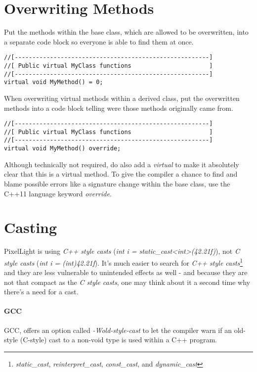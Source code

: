 \section{Overwriting Methods}
Put the methods within the base class, which are allowed to be overwritten, into a separate code block so everyone is able to find them at once.
\begin{lstlisting}[caption=Virtual methods within a base class]
//[-------------------------------------------------------]
//[ Public virtual MyClass functions                      ]
//[-------------------------------------------------------]
virtual void MyMethod() = 0;
\end{lstlisting}

When overwriting virtual methods within a derived class, put the overwritten methods into a code block telling were those methods originally came from.
\begin{lstlisting}[caption=Overwriting virtual methods within a derived class]
//[-------------------------------------------------------]
//[ Public virtual MyClass functions                      ]
//[-------------------------------------------------------]
virtual void MyMethod() override;
\end{lstlisting}
Although technically not required, do also add a \emph{virtual} to make it absolutely clear that this is a virtual method. To give the compiler a chance to find and blame possible errors like a signature change within the base class, use the C++11 language keyword \emph{override}.




\section{Casting}
PixelLight is using \emph{C++ style casts} (\emph{int i = static\_cast<int>(42.21f)}), not \emph{C style casts} (\emph{int i = (int)42.21f}). It's much easier to search for \emph{C++ style casts}\footnote{\emph{static\_cast}, \emph{reinterpret\_cast}, \emph{const\_cast}, and \emph{dynamic\_cast}} and they are less vulnerable to unintended effects as well - and because they are not that compact as the \emph{C style casts}, one may think about it a second time why there's a need for a cast.

\paragraph{\ac{GCC}}
\ac{GCC}, offers an option called \emph{-Wold-style-cast} to let the compiler warn if an old-style (C-style) cast to a non-void type is used within a C++ program.




